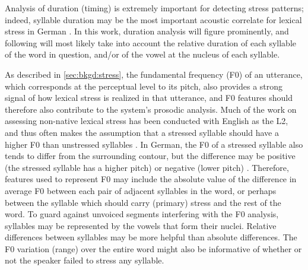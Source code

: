 	

	Analysis of duration (timing) is extremely important for detecting stress patterns;
indeed, syllable duration may be the most important acoustic correlate for lexical stress in German \citep{Dogil1999}.
In this work, duration analysis will figure prominently, and following \textcite{Bonneau2011} will most likely take into account the relative duration of each syllable of the word in question, and/or of the vowel at the nucleus of each syllable. %

	As described in \cref{sec:bkgd:stress}, the fundamental frequency (F0) of an utterance, which corresponds at the perceptual level to its pitch, also provides a strong signal of how lexical stress is realized in that utterance, and F0 features should therefore also contribute to the system's prosodic analysis. 
	Much of the work on assessing non-native lexical stress has been conducted with English as the L2, and thus often makes the assumption that a stressed syllable should have a higher F0 than unstressed syllables \citep{Bonneau2011}. In German, the F0 of a stressed syllable also tends to differ from the surrounding contour, but the difference may be positive (the stressed syllable has a higher pitch) or negative (lower pitch) \citep[p.~267]{Cutler2005}. Therefore, features used to represent F0 may include the absolute value of the difference in average F0 between each pair of adjacent syllables in the word, or perhaps between the syllable which should carry (primary) stress and the rest of the word. To guard against unvoiced segments interfering with the F0 analysis, syllables may be represented by the vowels that form their nuclei. Relative differences between syllables may be more helpful than absolute differences. The F0 variation (range) over the entire word might also be informative of whether or not the speaker failed to stress any syllable.%
	
